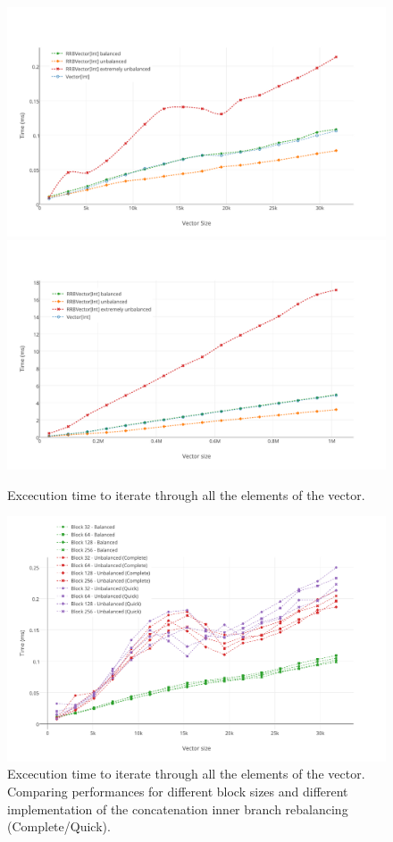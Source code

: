\begin{figure}[h!]
  \centering
  \includegraphics[width=\textwidth]{Benchmarks/Iteration_3.pdf}
  \includegraphics[width=\textwidth]{Benchmarks/Iteration_4.pdf}
  \label{IterationBenchmarks}
  \caption{Excecution time to iterate through all the elements of the vector.}
\end{figure}

\begin{figure}[h!]
  \centering
  \label{IterationBlocksBenchmarks}
  \includegraphics[width=\textwidth]{Benchmarks/Iteration_blocks_3.pdf}
  \caption{Excecution time to iterate through all the elements of the vector. Comparing performances for different block sizes and different implementation of the concatenation inner branch rebalancing (Complete/Quick).}
\end{figure}

